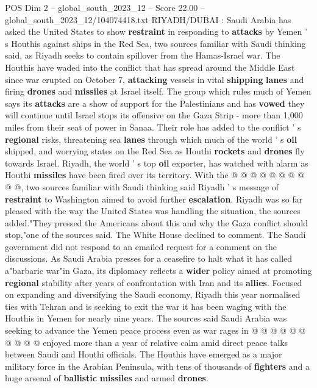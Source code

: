 \begin{textsample}{POS Dim 2 – global\_south\_2023\_12 – Score 22.00 – global\_south\_2023\_12/104074418.txt}  \label{ex:f2_pos_152}
RIYADH/DUBAI : Saudi Arabia has asked the United States to show \textbf{restraint} in responding to \textbf{attacks} by Yemen ' s Houthis against ships in the Red Sea, two sources familiar with Saudi thinking said, as Riyadh seeks to contain spillover from the Hamas-Israel war.
The Houthis have waded into the conflict that has spread around the Middle East since war erupted on October 7, \textbf{attacking} vessels in vital \textbf{shipping} \textbf{lanes} and firing \textbf{drones} and \textbf{missiles} at Israel itself.
The group which rules much of Yemen says its \textbf{attacks} are a show of support for the Palestinians and has \textbf{vowed} they will continue until Israel stops its offensive on the Gaza Strip - more than 1,000 miles from their seat of power in Sanaa.
Their role has added to the conflict ' s \textbf{regional} risks, threatening sea \textbf{lanes} through which much of the world ' s \textbf{oil} shipped, and worrying states on the Red Sea as Houthi \textbf{rockets} and \textbf{drones} fly towards Israel.
Riyadh, the world ' s top \textbf{oil} exporter, has watched with alarm as Houthi \textbf{missiles} have been fired over its territory.
With the @ @ @ @ @ @ @ @ @ @, two sources familiar with Saudi thinking said Riyadh ' s message of \textbf{restraint} to Washington aimed to avoid further \textbf{escalation}.
Riyadh was so far pleased with the way the United States was handling the situation, the sources added."They pressed the Americans about this and why the Gaza conflict should stop,"one of the sources said.
The White House declined to comment.
The Saudi government did not respond to an emailed request for a comment on the discussions.
As Saudi Arabia presses for a ceasefire to halt what it has called a"barbaric war"in Gaza, its diplomacy reflects a \textbf{wider} policy aimed at promoting \textbf{regional} stability after years of confrontation with Iran and its \textbf{allies}.
Focused on expanding and diversifying the Saudi economy, Riyadh this year normalised ties with Tehran and is seeking to exit the war it has been waging with the Houthis in Yemen for nearly nine years.
The sources said Saudi Arabia was seeking to advance the Yemen peace process even as war rages in @ @ @ @ @ @ @ @ @ @ enjoyed more than a year of relative calm amid direct peace talks between Saudi and Houthi officials.
The Houthis have emerged as a major military force in the Arabian Peninsula, with tens of thousands of \textbf{fighters} and a huge arsenal of \textbf{ballistic} \textbf{missiles} and armed \textbf{drones}.

\end{textsample}
